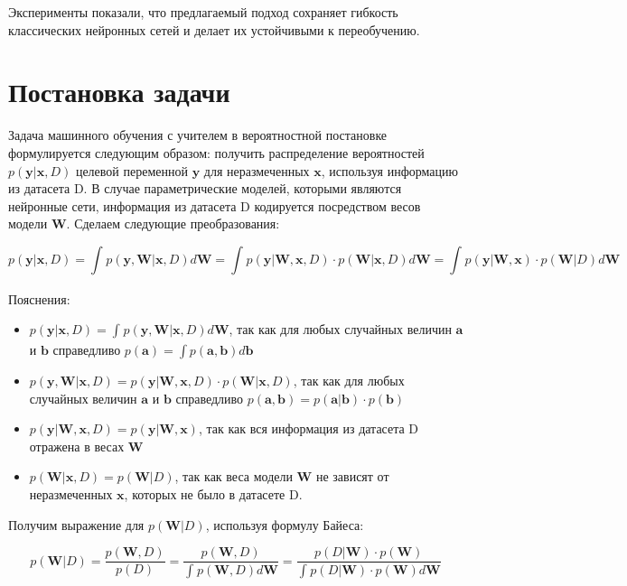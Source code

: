 \documentclass{article}
\begin{document}
Эксперименты показали, что предлагаемый подход сохраняет гибкость классических нейронных сетей и делает их устойчивыми к переобучению.

\section{Постановка задачи}

Задача машинного обучения с учителем в вероятностной постановке формулируется следующим образом:
получить распределение вероятностей $p(\mathbf{y} | \mathbf{x}, D)$ целевой переменной $\mathbf{y}$
для неразмеченных $\mathbf{x}$, используя информацию из датасета D. В случае параметрические моделей, которыми являются нейронные сети,
информация из датасета D кодируется посредством весов модели $\mathbf{W}$. Сделаем следующие преобразования:

\[
p(\mathbf{y} | \mathbf{x}, D) =
\int_{}{} p(\mathbf{y}, \mathbf{W} | \mathbf{x}, D) d\mathbf{W} =
\int_{}{} p(\mathbf{y} | \mathbf{W}, \mathbf{x}, D) \cdot p(\mathbf{W} | \mathbf{x}, D) d\mathbf{W} =
\int_{}{} p(\mathbf{y} | \mathbf{W}, \mathbf{x}) \cdot p(\mathbf{W} | D) d\mathbf{W}
\]

Пояснения:
\begin{itemize}
 \item $p(\mathbf{y} | \mathbf{x}, D) = \int_{}{} p(\mathbf{y}, \mathbf{W} | \mathbf{x}, D) d\mathbf{W}$,
 так как для любых случайных величин $\mathbf{a}$ и $\mathbf{b}$ справедливо $p(\mathbf{a}) = \int p(\mathbf{a}, \mathbf{b}) d\mathbf{b}$
 \item $p(\mathbf{y}, \mathbf{W} | \mathbf{x}, D) = p(\mathbf{y} | \mathbf{W}, \mathbf{x}, D) \cdot p(\mathbf{W} | \mathbf{x}, D)$,
 так как для любых случайных величин $\mathbf{a}$ и $\mathbf{b}$ справедливо $p(\mathbf{a}, \mathbf{b}) = p(\mathbf{a}| \mathbf{b}) \cdot p(\mathbf{b})$
 \item $p(\mathbf{y} | \mathbf{W}, \mathbf{x}, D) = p(\mathbf{y} | \mathbf{W}, \mathbf{x})$, так как вся информация из датасета D отражена в весах $\mathbf{W}$
 \item $p(\mathbf{W} | \mathbf{x}, D) = p(\mathbf{W} | D)$, так как веса модели $\mathbf{W}$ не зависят от неразмеченных $\mathbf{x}$, которых не было в датасете D.
\end{itemize}

Получим выражение для $p(\mathbf{W}| D)$, используя формулу Байеса:

\[
p(\mathbf{W}| D) =
\dfrac{p(\mathbf{W}, D)}{p(D)} =
\dfrac{p(\mathbf{W}, D)}{\int_{}{} p(\mathbf{W}, D) d\mathbf{W}} =
\dfrac{p(D | \mathbf{W}) \cdot p(\mathbf{W})}{\int_{}{} p(D | \mathbf{W}) \cdot p(\mathbf{W}) d\mathbf{W}}
\]
\end{document}
